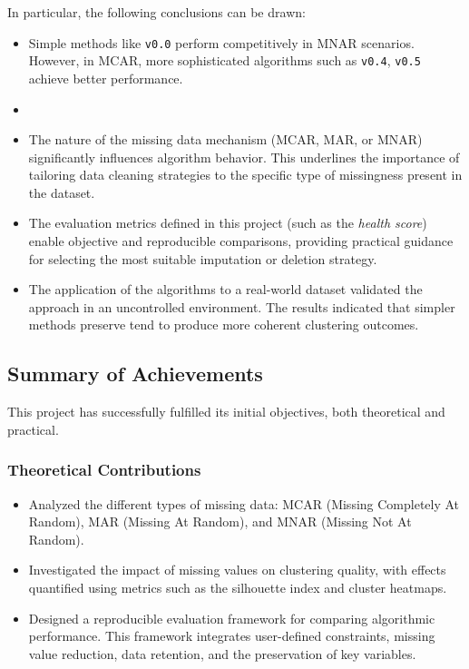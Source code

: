 \documentclass[a4paper,12pt]{article}
\begin{document}
In particular, the following conclusions can be drawn:
\begin{itemize}
    \item Simple methods like \texttt{v0.0} perform competitively in MNAR scenarios. However, in MCAR, more sophisticated algorithms such as \texttt{v0.4}, \texttt{v0.5} achieve better performance.
    \item 
    \item The nature of the missing data mechanism (MCAR, MAR, or MNAR) significantly influences algorithm behavior. This underlines the importance of tailoring data cleaning strategies to the specific type of missingness present in the dataset.
    
    \item The evaluation metrics defined in this project (such as the \textit{health score}) enable objective and reproducible comparisons, providing practical guidance for selecting the most suitable imputation or deletion strategy.
    
    \item The application of the algorithms to a real-world dataset validated the approach in an uncontrolled environment. The results indicated that simpler methods preserve tend to produce more coherent clustering outcomes.
\end{itemize}

\subsection{Summary of Achievements}
This project has successfully fulfilled its initial objectives, both theoretical and practical.

\subsubsection{Theoretical Contributions}
\begin{itemize}
    \item Analyzed the different types of missing data: MCAR (Missing Completely At Random), MAR (Missing At Random), and MNAR (Missing Not At Random).
    
    \item Investigated the impact of missing values on clustering quality, with effects quantified using metrics such as the silhouette index and cluster heatmaps.
    
    \item Designed a reproducible evaluation framework for comparing algorithmic performance. This framework integrates user-defined constraints, missing value reduction, data retention, and the preservation of key variables.
\end{itemize}
\end{document}
